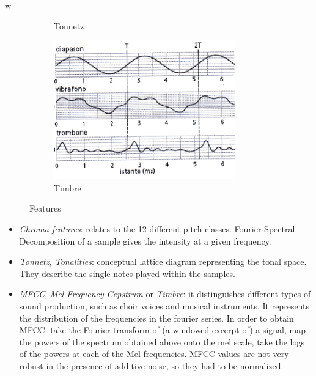 w\documentclass[11pt, oneside]{article}
\begin{document}
\begin{figure}[h]
\begin{subfigure}[b]{0.30\textwidth}
        \caption{Tonnetz}
        \label{fig:RBFgamma2}
    \end{subfigure}\hfill
    \begin{subfigure}[b]{0.30\textwidth}
        \includegraphics[width=\textwidth]{d.png}
        \caption{Timbre}
        \label{fig:RBFgamma3}
    \end{subfigure}
    \caption{Features}
    \label{fig:svmrbfC}
\end{figure}

\begin{itemize}
    \item \emph{Chroma features}: relates to the 12 different pitch classes. Fourier Spectral Decomposition of a sample gives the intensity at a given frequency.
    \item \emph{Tonnetz, Tonalities}: conceptual lattice diagram representing the tonal space. They describe the single notes played within the samples.
    \item \emph{MFCC}, \emph{Mel Frequency Cepstrum} or \emph{Timbre}: it distinguishes different types of sound production, such as choir voices and musical instruments. It represents the distribution of the frequencies in the fourier series.
    In order to obtain MFCC: take the Fourier transform of (a windowed excerpt of) a signal, map the powers of the spectrum obtained above onto the mel scale, take the logs of the powers at each of the Mel frequencies.
    MFCC values are not very robust in the presence of additive noise, so they had to be normalized.
\end{itemize}
\end{document}
